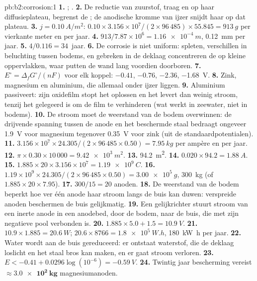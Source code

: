 \begin{solution}{pb:b2:corrosion:1}
\textbf{1.} ; .
\textbf{2.} De reductie van zuurstof, traag en op haar diffusieplateau,
begrenst de ; de anodische kromme van ijzer snijdt haar op dat plateau.
\textbf{3.} $j = \qty{0.10}{A/m^2}$: $0.10 \times 3.156 \times 10^7/(2 \times 96\,485)
\times 55.845 = \qty{913}{g}$ per vierkante meter en per jaar.
\textbf{4.} $913/7.87 \times 10^6 = \qty{1.16e-4}{m}$, \qty{0.12}{mm} per jaar.
\textbf{5.} $4/0.116 = 34$~jaar.
\textbf{6.} De corrosie is niet uniform: spleten, verschillen in beluchting
tussen bodems, en gebreken in de deklaag concentreren de  op
kleine oppervlakken, waar putten de wand lang voordien doorboren.
\textbf{7.} $E^\circ = \Delta_f G^\circ/(nF)$ voor elk koppel:  $-0.41$,  $-0.76$,
 $-2.36$,  \qty{-1.68}{V}.
\textbf{8.} Zink, magnesium en aluminium, die allemaal onder ijzer liggen.
\textbf{9.} Aluminium passiveert: zijn oxidefilm stopt het oplossen en het
levert dan weinig stroom, tenzij het gelegeerd is om de film te verhinderen (wat werkt
in zeewater, niet in bodems).
\textbf{10.} De stroom moet de weerstand van de bodem overwinnen: de drijvende
spanning tussen de anode en het beschermde staal bedraagt ongeveer \qty{1.9}{V} voor
magnesium tegenover \qty{0.35}{V} voor zink (uit de standaardpotentialen).
\textbf{11.} $3.156 \times 10^7 \times 24.305/(2 \times 96\,485 \times 0.50) =
\qty{7.95}{kg}$ per ampère en per jaar.
\textbf{12.} $\pi \times 0.30 \times 10\,000 = \qty{9.42e3}{m^2}$.
\textbf{13.} \qty{94.2}{m^2}.
\textbf{14.} $0.020 \times 94.2 = \qty{1.88}{A}$.
\textbf{15.} $1.885 \times 20 \times 3.156 \times 10^7 = \qty{1.19e9}{C}$.
\textbf{16.} $1.19 \times 10^9 \times 24.305/(2 \times 96\,485 \times 0.50) =
\qty{3.00e5}{g}$, \qty{300}{kg} (of $1.885 \times 20 \times 7.95$).
\textbf{17.} $300/15 = 20$ anoden.
\textbf{18.} De weerstand van de bodem beperkt hoe ver één anode haar stroom
langs de buis kan duwen: verspreide anoden beschermen de buis gelijkmatig.
\textbf{19.} Een gelijkrichter stuurt stroom van een inerte anode in een anodebed,
door de bodem, naar de buis, die met zijn negatieve pool verbonden is.
\textbf{20.} $1.885 \times 5.0 + 1.5 = \qty{10.9}{V}$.
\textbf{21.} $10.9 \times 1.885 = \qty{20.6}{W}$; $20.6 \times 8766 = \qty{1.8e5}{W.h}$,
\qty{180}{kW.h} per jaar.
\textbf{22.} Water wordt aan de buis gereduceerd: er ontstaat waterstof, die de deklaag loslicht en
het staal bros kan maken, en er gaat stroom verloren.
\textbf{23.} $E < -0.41 + 0.0296\log(10^{-6}) = \qty{-0.59}{V}$.
\textbf{24.} Twintig jaar bescherming vereist $\boldsymbol{\approx \qty{3.0e2}{kg}}$
magnesiumanoden.
\end{solution}
